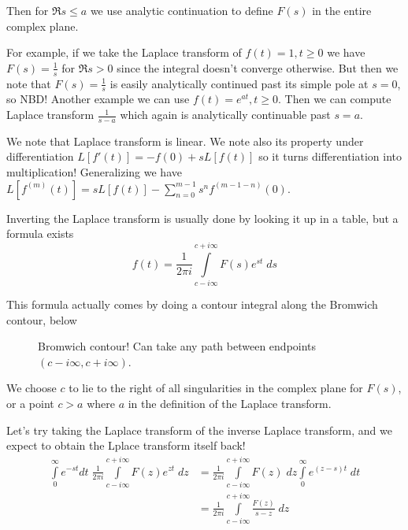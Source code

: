 \documentclass[10pt]{report}
\begin{document}
Then for $\Re s \leq a$ we use analytic continuation to define $F(s)$ in the entire complex plane. 

For example, if we take the Laplace transform of $f(t) = 1, t \geq 0$ we have $F(s) = \frac{1}{s}$ for $\Re s > 0$ since the integral doesn't converge otherwise. But then we note that $F(s) = \frac{1}{s}$ is easily analytically continued past its simple pole at $s=0$, so NBD! Another example we can use $f(t) = e^{at}, t \geq 0$. Then we can compute Laplace transform $\frac{1}{s-a}$ which again is analytically continuable past $s = a$. 

We note that Laplace transform is linear. We note also its property under differentiation $L[f'(t)] = -f(0) + sL[f(t)]$ so it turns differentiation into multiplication! Generalizing we have $L[f^{(m)}(t)] = sL[f(t)] - \sum_{n=0}^{m-1}s^{n}f^{(m-1-n)}(0)$.

Inverting the Laplace transform is usually done by looking it up in a table, but a formula exists
\begin{equation}
    f(t) = \frac{1}{2\pi i}\displaystyle\int\limits_{c - i\infty}^{c + i\infty}F(s) e^{st}\;ds
\end{equation}

This formula actually comes by doing a contour integral along the Bromwich contour, below
\begin{figure}[!h]
    \centering
    \caption{Bromwich contour! Can take any path between endpoints $(c - i\infty, c + i\infty)$.}
\end{figure}
We choose $c$ to lie to the right of all singularities in the complex plane for $F(s)$, or a point $c > a$ where $a$ in the definition of the Laplace transform. 

Let's try taking the Laplace transform of the inverse Laplace transform, and we expect to obtain the Lplace transform itself back!
\begin{align}
    \displaystyle\int\limits_{0}^{\infty}e^{-st}dt\;\frac{1}{2\pi i}\displaystyle\int\limits_{c-i\infty}^{c+i\infty}F(z) e^{zt}\;dz &= \frac{1}{2\pi i}\displaystyle\int\limits_{c-i\infty}^{c+i\infty}F(z)\;dz\displaystyle\int\limits_{0}^{\infty}e^{(z-s)t}\;dt\\
    &= \frac{1}{2\pi i}\displaystyle\int\limits_{c-i\infty}^{c+i\infty}\frac{F(z)}{s-z}\;dz
\end{align}
\end{document}
